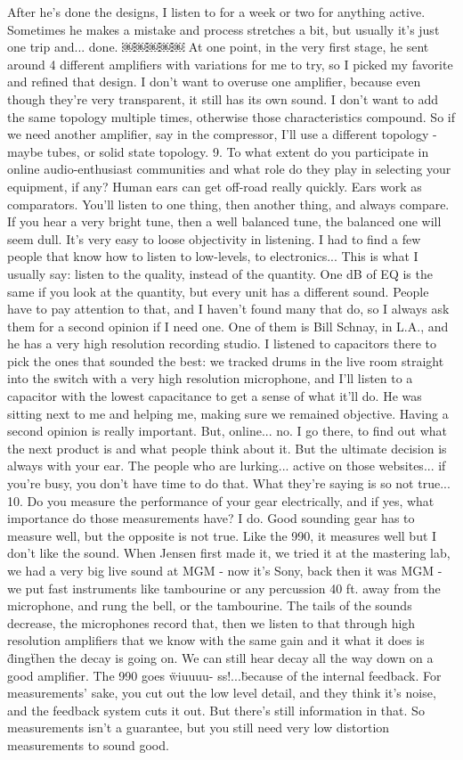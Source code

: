 After he's done the designs, I listen to for a week or two for anything active. Sometimes he makes a mistake and process stretches a bit, but usually it's just one trip and... done.
￼￼￼￼￼
At one point, in the very first stage, he sent around 4 different amplifiers with variations for me to try, so I picked my favorite and refined that design. I don't want to overuse one amplifier, because even though they're very transparent, it still has its own sound. I don't want to add the same topology multiple times, otherwise those characteristics compound. So if we need another amplifier, say in the compressor, I'll use a different topology - maybe tubes, or solid state topology.
9. To what extent do you participate in online audio-enthusiast communities and what role do they play in selecting your equipment, if any?
Human ears can get off-road really quickly. Ears work as comparators. You'll listen to one thing, then another thing, and always compare. If you hear a very bright tune, then a well balanced tune, the balanced one will seem dull. It's very easy to loose objectivity in listening. I had to find a few people that know how to listen to low-levels, to electronics... This is what I usually say: listen to the quality, instead of the quantity. One dB of EQ is the same if you look at the quantity, but every unit has a different sound. People have to pay attention to that, and I haven't found many that do, so I always ask them for a second opinion if I need one. One of them is Bill Schnay, in L.A., and he has a very high resolution recording studio. I listened to capacitors there to pick the ones that sounded the best: we tracked drums in the live room straight into the switch with a very high resolution microphone, and I'll listen to a capacitor with the lowest capacitance to get a sense of what it'll do. He was sitting next to me and helping me, making sure we remained objective. Having a second opinion is really important.
But, online... no. I go there, to find out what the next product is and what people think about it. But the ultimate decision is always with your ear. The people who are lurking... active on those websites... if you're busy, you don't have time to do that. What they're saying is so not true...
10. Do you measure the performance of your gear electrically, and if yes, what importance do those measurements have?
I do. Good sounding gear has to measure well, but the opposite is not true. Like the 990, it measures well but I don't like the sound. When Jensen first made it, we tried it at the mastering lab, we had a very big live sound at MGM - now it's Sony, back then it was MGM - we put fast instruments like tambourine or any percussion 40 ft. away from the microphone, and rung the bell, or the tambourine. The tails of the sounds decrease, the microphones record that, then we listen to that through high resolution amplifiers that we know with the same gain and it what it does is \"ding\" then the decay is going on. We can still hear decay all the way down on a good amplifier. The 990 goes \"wiuuuu- ss!...\" because of the internal feedback. For measurements' sake, you cut out the low level detail, and they think it's noise, and the feedback system cuts it out. But there's still information in that. So measurements isn't a guarantee, but you still need very low distortion measurements to sound good.
